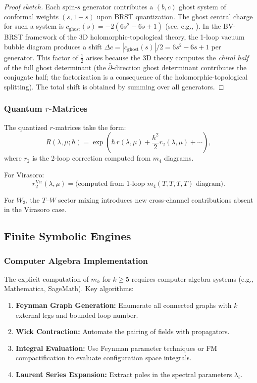 \begin{proof}[Proof sketch]
Each spin-$s$ generator contributes a $(b,c)$ ghost system of conformal weights $(s, 1-s)$ upon BRST quantization. The ghost central charge for such a system is $c_{\text{ghost}}(s) = -2(6s^2 - 6s + 1)$ (see, e.g., \cite{FMS86,Pol98}). In the BV-BRST framework of the 3D holomorphic-topological theory, the 1-loop vacuum bubble diagram produces a shift $\Delta c = |c_{\text{ghost}}(s)|/2 = 6s^2 - 6s + 1$ per generator. This factor of $\tfrac{1}{2}$ arises because the 3D theory computes the \emph{chiral half} of the full ghost determinant (the $\bar\partial$-direction ghost determinant contributes the conjugate half; the factorization is a consequence of the holomorphic-topological splitting). The total shift is obtained by summing over all generators.
\end{proof}

\subsubsection{Quantum $r$-Matrices}

The quantized $r$-matrices take the form:
\begin{equation}
R(\lambda,\mu; \hbar) = \exp\left( \hbar \, r(\lambda,\mu) + \frac{\hbar^2}{2} r_2(\lambda,\mu) + \cdots \right),
\end{equation}
where $r_2$ is the 2-loop correction computed from $m_4$ diagrams.

For Virasoro:
\begin{equation}
r_2^{\text{Vir}}(\lambda,\mu) = \text{(computed from 1-loop } m_4(T,T,T,T) \text{ diagram)}.
\end{equation}

For $W_3$, the $T$--$W$ sector mixing introduces new cross-channel contributions absent in the Virasoro case.

\subsection{Finite Symbolic Engines}

\subsubsection{Computer Algebra Implementation}

The explicit computation of $m_k$ for $k \geq 5$ requires computer algebra systems (e.g., Mathematica, SageMath). Key algorithms:
\begin{enumerate}
\item \textbf{Feynman Graph Generation:} Enumerate all connected graphs with $k$ external legs and bounded loop number.
\item \textbf{Wick Contraction:} Automate the pairing of fields with propagators.
\item \textbf{Integral Evaluation:} Use Feynman parameter techniques or FM compactification to evaluate configuration space integrals.
\item \textbf{Laurent Series Expansion:} Extract poles in the spectral parameters $\lambda_i$.
\end{enumerate}

